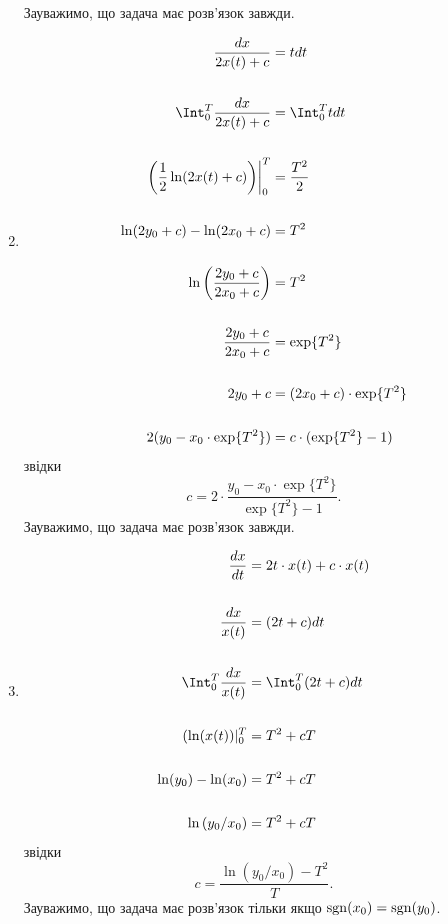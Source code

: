 \begin{solution}
\begin{enumerate}
Зауважимо, що задача має розв'язок завжди.
\item 
\begin{align*}
    \dfrac{dx}{2x(t) + c} &= t dt \\
    \\
    \Int_0^T \dfrac{dx}{2x(t) + c} &= \Int_0^T t dt \\
    \\
    \left.\left(\dfrac 12 \ln(2x(t) + c)\right)\right|_0^T &= \dfrac {T^2} 2 \\
    \\
    \ln(2y_0 + c) - \ln(2x_0 + c) &= T^2 \\
    \\
    \ln\left(\dfrac{2y_0 + c}{2x_0 + c}\right) &= T^2 \\
    \\
    \dfrac{2y_0 + c}{2x_0 + c} &= \exp\{T^2\} \\
    \\
    2y_0 + c &= (2x_0 + c)\cdot \exp\{T^2\} \\
    \\
    2(y_0 - x_0 \cdot \exp\{T^2\}) &= c \cdot (\exp\{T^2\} - 1) 
\end{align*}
звідки
\[c = 2\cdot \dfrac{y_0 - x_0 \cdot \exp\{T^2\}}{\exp\{T^2\} - 1}. \]
Зауважимо, що задача має розв'язок завжди.
\item 
\begin{align*}
    \dfrac{dx}{dt} &= 2t\cdot x(t) + c\cdot x(t) \\
    \\
    \dfrac{dx}{x(t)} &= (2t + c) dt \\
    \\
    \Int_0^T \dfrac{dx}{x(t)} &= \Int_0^T (2t + c) dt \\
    \\
    (\ln(x(t))|_0^T &= T^2 + cT \\
    \\
    \ln(y_0) - \ln(x_0) &= T^2 + cT \\ 
    \\
    \ln\left(y_0/x_0\right) &= T^2 + cT 
\end{align*}
звідки
\[ c = \dfrac{\ln\left(y_0/x_0\right) - T^2}{T}. \]
Зауважимо, що задача має розв'язок тільки якщо $\operatorname{sgn}(x_0) = \operatorname{sgn}(y_0)$.
\end{enumerate}
\end{solution} 

